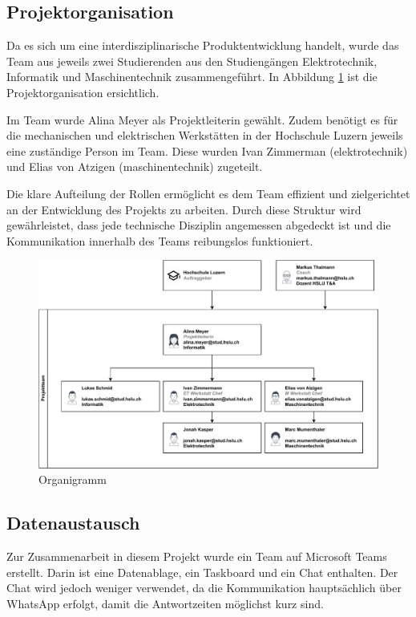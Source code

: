 \subsection{Projektorganisation}

Da es sich um eine interdisziplinarische Produktentwicklung handelt, wurde das Team aus jeweils zwei Studierenden aus den Studiengängen Elektrotechnik, Informatik und Maschinentechnik zusammengeführt. In Abbildung \ref{fig:Organigramm} ist die Projektorganisation ersichtlich. 

Im Team wurde Alina Meyer als Projektleiterin gewählt. Zudem benötigt es für die mechanischen und elektrischen Werkstätten in der Hochschule Luzern jeweils eine zuständige Person im Team. Diese wurden Ivan Zimmerman (\acrshort{elektrotechnik}) und Elias von Atzigen (\acrshort{maschinentechnik}) zugeteilt.

Die klare Aufteilung der Rollen ermöglicht es dem Team effizient und zielgerichtet an der Entwicklung des Projekts zu arbeiten. Durch diese Struktur wird gewährleistet, dass jede technische Disziplin angemessen abgedeckt ist und die Kommunikation innerhalb des Teams reibungslos funktioniert.

\begin{figure}[H]
\centering
\includegraphics[width=\textwidth]{img/Projektorganisation.pdf}
\caption{Organigramm}
\label{fig:Organigramm}
\end{figure}

\subsection{Datenaustausch}

Zur Zusammenarbeit in diesem Projekt wurde ein Team auf Microsoft Teams erstellt.
Darin ist eine Datenablage, ein Taskboard und ein Chat enthalten. Der Chat wird jedoch weniger verwendet, da die Kommunikation hauptsächlich über WhatsApp erfolgt, damit die Antwortzeiten möglichst kurz sind.

